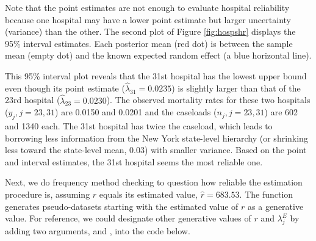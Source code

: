 \documentclass[article]{jss}
\begin{document}
Note that the point estimates are not enough to evaluate hospital reliability because one hospital may have a lower point estimate but  larger uncertainty (variance) than the other. The second plot of Figure \ref{fig:hospshr} displays the 95\% interval estimates. Each posterior mean (red dot) is between the sample mean (empty dot) and the known expected random effect (a blue horizontal line). %

This 95\% interval plot reveals that the 31st hospital has the lowest upper bound even though its point estimate ($\hat{\lambda}_{31}=0.0235$) is slightly larger than that of the 23rd hospital ($\hat{\lambda}_{23}=0.0230$). The observed  mortality rates for these two hospitals ($y_{j}, j=23, 31$) are 0.0150 and 0.0201 and the caseloads ($n_{j}, j =23, 31$) are 602 and 1340 each. The 31st hospital has twice the caseload, which leads to borrowing less information from the New York state-level hierarchy (or shrinking less toward the state-level mean, 0.03) with smaller variance. Based on the point and interval estimates, the 31st hospital seems the most reliable one.

Next, we do frequency method checking to question how reliable the estimation procedure is, assuming $r$ equals its estimated value, $\hat{r}=683.53$.  The function   generates pseudo-datasets starting with the estimated value of $r$  as a generative value. For reference, we could designate other generative values of $r$ and $\lambda^E_j$ by adding two arguments,  and , into the code below.

\end{document}
